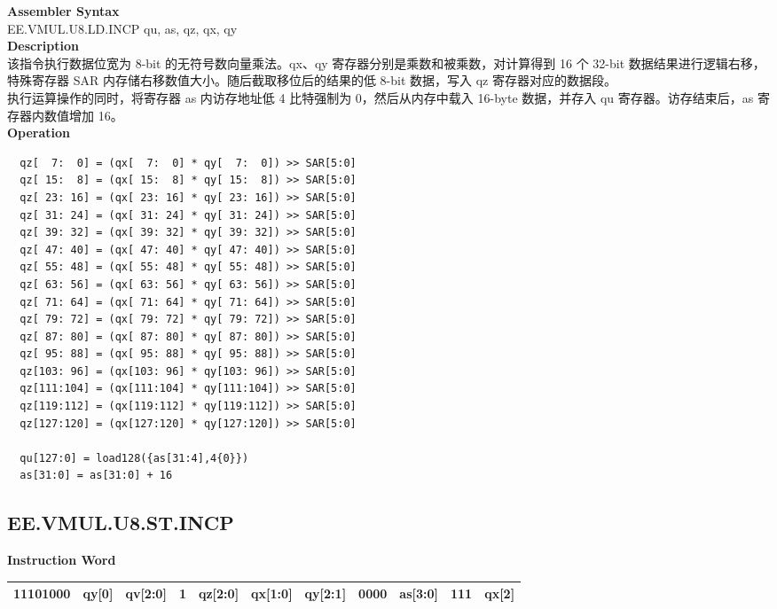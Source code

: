 \textbf{Assembler Syntax} \\
EE.VMUL.U8.LD.INCP qu, as, qz, qx, qy \\
\textbf{Description} \\
该指令执行数据位宽为 8-bit 的无符号数向量乘法。qx、qy 寄存器分别是乘数和被乘数，对计算得到 16 个 32-bit 数据结果进行逻辑右移，特殊寄存器 SAR 内存储右移数值大小。随后截取移位后的结果的低 8-bit 数据，写入 qz 寄存器对应的数据段。\\ 执行运算操作的同时，将寄存器 as 内访存地址低 4 比特强制为 0，然后从内存中载入 16-byte 数据，并存入 qu 寄存器。访存结束后，as 寄存器内数值增加 16。\\
\textbf{Operation}
\begin{lstlisting}
  qz[  7:  0] = (qx[  7:  0] * qy[  7:  0]) >> SAR[5:0]
  qz[ 15:  8] = (qx[ 15:  8] * qy[ 15:  8]) >> SAR[5:0]
  qz[ 23: 16] = (qx[ 23: 16] * qy[ 23: 16]) >> SAR[5:0]
  qz[ 31: 24] = (qx[ 31: 24] * qy[ 31: 24]) >> SAR[5:0]
  qz[ 39: 32] = (qx[ 39: 32] * qy[ 39: 32]) >> SAR[5:0]
  qz[ 47: 40] = (qx[ 47: 40] * qy[ 47: 40]) >> SAR[5:0]
  qz[ 55: 48] = (qx[ 55: 48] * qy[ 55: 48]) >> SAR[5:0]
  qz[ 63: 56] = (qx[ 63: 56] * qy[ 63: 56]) >> SAR[5:0]
  qz[ 71: 64] = (qx[ 71: 64] * qy[ 71: 64]) >> SAR[5:0]
  qz[ 79: 72] = (qx[ 79: 72] * qy[ 79: 72]) >> SAR[5:0]
  qz[ 87: 80] = (qx[ 87: 80] * qy[ 87: 80]) >> SAR[5:0]
  qz[ 95: 88] = (qx[ 95: 88] * qy[ 95: 88]) >> SAR[5:0]
  qz[103: 96] = (qx[103: 96] * qy[103: 96]) >> SAR[5:0]
  qz[111:104] = (qx[111:104] * qy[111:104]) >> SAR[5:0]
  qz[119:112] = (qx[119:112] * qy[119:112]) >> SAR[5:0]
  qz[127:120] = (qx[127:120] * qy[127:120]) >> SAR[5:0]

  qu[127:0] = load128({as[31:4],4{0}})
  as[31:0] = as[31:0] + 16
\end{lstlisting}

\clearpage
\subsection{EE.VMUL.U8.ST.INCP}\label{instruction:EEVMULU8STINCP}
\setlength\tabcolsep{6pt}
\textbf{Instruction Word} \\
\begin{tabular}{|c|c|c|c|c|c|c|c|c|c|c|}
	\hline
	11101000 & qy[0] & qv[2:0] & 1 & qz[2:0] & qx[1:0] & qy[2:1] & 0000 & as[3:0] & 111 & qx[2] \\
	\hline
\end{tabular}


